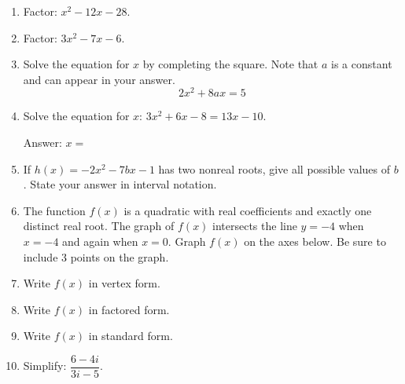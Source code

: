 \begin{enumerate}[leftmargin=*, label=\textbf{\arabic*.}, resume]

  \item Factor: $x^2 - 12x - 28$. 
  \vgap

  \item Factor: $3x^2 - 7x - 6$. 
  \vgappp

  \item Solve the equation for $x$ by completing the square. Note that $a$ is a constant and can appear in your answer. 
  \[
  2x^2 + 8ax = 5
  \]
  \vgappp

  \item Solve the equation for $x$: $3x^2 + 6x - 8 = 13x - 10$. 

  Answer: $x = $ \blank
  \vgappp

  \item If $h(x) = -2x^2 - 7bx - 1$ has two nonreal roots, give all possible values of $b$. State your answer in interval notation. 
  \vgappp

  \item The function $f(x)$ is a quadratic with real coefficients and exactly one distinct real root. The graph of $f(x)$ intersects the line $y = -4$ when $x = -4$ and again when $x = 0$. Graph $f(x)$ on the axes below. Be sure to include 3 points on the graph. 

  \begin{center}
  \end{center}
  \vgapp

  \item Write $f(x)$ in vertex form. 
  \vgapp

  \item Write $f(x)$ in factored form. 
  \vgap

  \item Write $f(x)$ in standard form. 
  \vgappp

  \item Simplify: $\dfrac{6-4i}{3i-5}$. 
  \vgappp


\end{enumerate}
